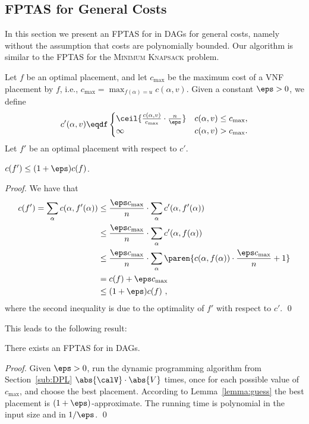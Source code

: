 
\subsection{FPTAS for General Costs}
\label{sub:fptas}

In this section we present an FPTAS for \scp in DAGs for general
costs, namely without the assumption that costs are polynomially
bounded.  Our algorithm is similar to the FPTAS for the
\textsc{Minimum Knapsack} problem.

Let $f$ be an optimal placement, and let $c_{\max}$ be the maximum
cost of a VNF placement by $f$, i.e., $c_{\max} = \max_{f(\alpha) =
  u} c(\alpha,v)$.
%
Given a constant $\eps>0$, we define
\[
c'(\alpha, v) \eqdf
\begin{cases}
\ceil{\frac{c(\alpha, v)}{c_{\max}} \cdot \frac{n}{\eps}}
       & c(\alpha, v) \leq c_{\max}, \\
\infty & c(\alpha, v) > c_{\max}.
\end{cases}
\]
Let $f'$ be an optimal placement with respect to $c'$.

\begin{lemma}
\label{lemma:guess}
$c(f') \leq (1+\eps)c(f)$.
\end{lemma}
\begin{proof}
We have that
\begin{align*}
c(f')
=    \sum_{\alpha} c(\alpha,f'(\alpha)) %
& \leq \frac{\eps c_{\max}}{n} \cdot \sum_{\alpha} c'(\alpha,f'(\alpha)) \\
& \leq \frac{\eps c_{\max}}{n} \cdot \sum_{\alpha} c'(\alpha,f(\alpha)) \\
& \leq \frac{\eps c_{\max}}{n} \cdot
     \sum_{\alpha}
       \paren{ c(\alpha,f(\alpha)) \cdot \frac{\eps c_{\max}}{n} + 1} \\
& =    c(f) + \eps c_{\max} \\
& \leq (1+\eps) c(f)
~,
\end{align*}
where the second inequality is due to the optimality of $f'$ with
respect to $c'$.
%
\qed
\end{proof}

This leads to the following result:

\begin{theorem}
\label{thm:fptas}
There exists an FPTAS for \scp in DAGs.
\end{theorem}
\begin{proof}
Given $\eps>0$, run the dynamic programming algorithm from
Section~\ref{sub:DPL} $\abs{\calV} \cdot \abs{V}$ times, once for each
possible value of $c_{\max}$, and choose the best placement.
According to Lemma~\ref{lemma:guess} the best placement is
$(1+\eps)$-approximate.  The running time is polynomial in the input
size and in $1/\eps$.
%
\qed
\end{proof}


